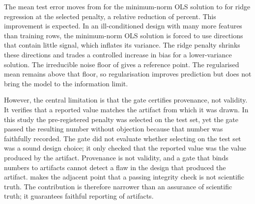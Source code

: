 The mean test error moves from  for the minimum-norm OLS solution to  for ridge regression at the selected penalty, a relative reduction of  percent. This improvement is expected. In an ill-conditioned design with many more features than training rows, the minimum-norm OLS solution is forced to use directions that contain little signal, which inflates its variance. The ridge penalty shrinks these directions and trades a controlled increase in bias for a lower-variance solution. The irreducible noise floor of  gives a reference point. The regularised mean remains above that floor, so regularisation improves prediction but does not bring the model to the information limit.

However, the central limitation is that the gate certifies provenance, not validity. It verifies that a reported value matches the artifact from which it was drawn. In this study the pre-registered penalty was selected on the test set, yet the gate passed the resulting number without objection because that number was faithfully recorded. The gate did not evaluate whether selecting on the test set was a sound design choice; it only checked that the reported value was the value produced by the artifact. Provenance is not validity, and a gate that binds numbers to artifacts cannot detect a flaw in the design that produced the artifact. \citet{luo2026xscientist} makes the adjacent point that a passing integrity check is not scientific truth. The contribution is therefore narrower than an assurance of scientific truth; it guarantees faithful reporting of artifacts.
